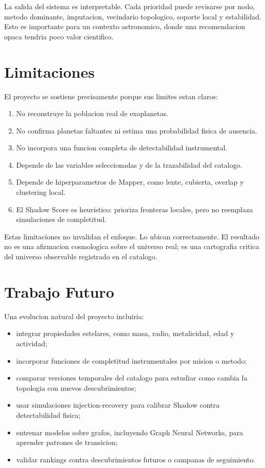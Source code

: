 \documentclass[11pt]{article}
\begin{document}
La salida del sistema es interpretable. Cada prioridad puede revisarse por nodo, metodo dominante, imputacion, vecindario topologico, soporte local y estabilidad. Esto es importante para un contexto astronomico, donde una recomendacion opaca tendria poco valor cientifico.

\section{Limitaciones}

El proyecto se sostiene precisamente porque sus limites estan claros:
\begin{enumerate}
  \item No reconstruye la poblacion real de exoplanetas.
  \item No confirma planetas faltantes ni estima una probabilidad fisica de ausencia.
  \item No incorpora una funcion completa de detectabilidad instrumental.
  \item Depende de las variables seleccionadas y de la trazabilidad del catalogo.
  \item Depende de hiperparametros de Mapper, como lente, cubierta, overlap y clustering local.
  \item El Shadow Score es heuristico: prioriza fronteras locales, pero no reemplaza simulaciones de completitud.
\end{enumerate}

Estas limitaciones no invalidan el enfoque. Lo ubican correctamente. El resultado no es una afirmacion cosmologica sobre el universo real; es una cartografia critica del universo observable registrado en el catalogo.

\section{Trabajo Futuro}

Una evolucion natural del proyecto incluiria:
\begin{itemize}
  \item integrar propiedades estelares, como masa, radio, metalicidad, edad y actividad;
  \item incorporar funciones de completitud instrumentales por mision o metodo;
  \item comparar versiones temporales del catalogo para estudiar como cambia la topologia con nuevos descubrimientos;
  \item usar simulaciones injection-recovery para calibrar Shadow contra detectabilidad fisica;
  \item entrenar modelos sobre grafos, incluyendo Graph Neural Networks, para aprender patrones de transicion;
  \item validar rankings contra descubrimientos futuros o campanas de seguimiento.
\end{itemize}
\end{document}
